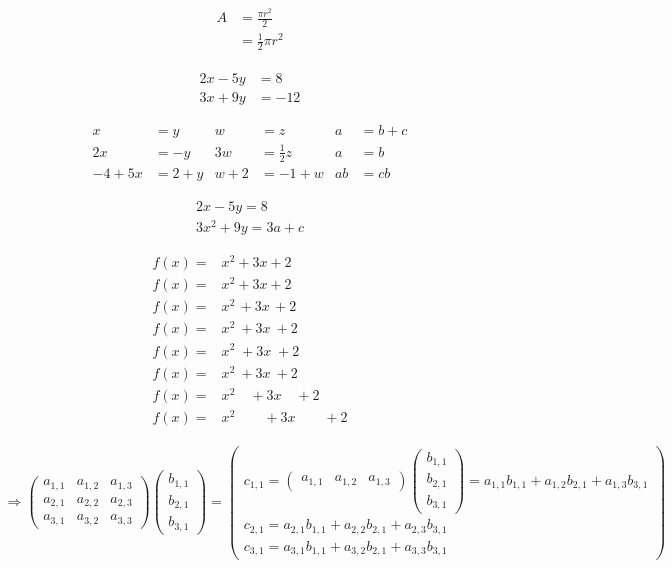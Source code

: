\documentclass{article}
\begin{document}
\begin{align*}
\begin{split}
A & = \frac{\pi r^2}{2} \\
& = \frac{1}{2} \pi r^2
\end{split}
\end{align*}

\begin{align*} 
2x - 5y &=  8 \\ 
3x + 9y &=  -12
\end{align*}

\begin{align*} 
x&=y           &  w &=z              &  a&=b+c\\
2x&=-y         &  3w&=\frac{1}{2}z   &  a&=b\\
-4 + 5x&=2+y   &  w+2&=-1+w          &  ab&=cb
\end{align*}

\begin{gather*} 
2x - 5y =  8 \\ 
3x^2 + 9y =  3a + c
\end{gather*}

\begin{align*}
f(x) =& x^2\! +3x\! +2 \\
f(x) =& x^2+3x+2 \\
f(x) =& x^2\, +3x\, +2 \\
f(x) =& x^2\: +3x\: +2 \\
f(x) =& x^2\; +3x\; +2 \\
f(x) =& x^2\ +3x\ +2 \\
f(x) =& x^2\quad +3x\quad +2 \\
f(x) =& x^2\qquad +3x\qquad +2
\end{align*}

\begin{align*}
\Rightarrow\begin{pmatrix}a_{1,1}&a_{1,2}&a_{1,3}\\a_{2,1}&a_{2,2}&a_{2,3}\\a_{3,1}&a_{3,2}&a_{3,3}\end{pmatrix}\begin{pmatrix}b_{1,1}\\b_{2,1}\\b_{3,1}\end{pmatrix}=\begin{pmatrix}c_{1,1}=\begin{pmatrix}a_{1,1}&a_{1,2}&a_{1,3}\end{pmatrix}\begin{pmatrix}b_{1,1}\\b_{2,1}\\b_{3,1}\end{pmatrix}=a_{1,1}b_{1,1}+a_{1,2}b_{2,1}+a_{1,3}b_{3,1}\\c_{2,1}=a_{2,1}b_{1,1}+a_{2,2}b_{2,1}+a_{2,3}b_{3,1}\\c_{3,1}=a_{3,1}b_{1,1}+a_{3,2}b_{2,1}+a_{3,3}b_{3,1}\end{pmatrix}
\end{align*}
\end{document}
